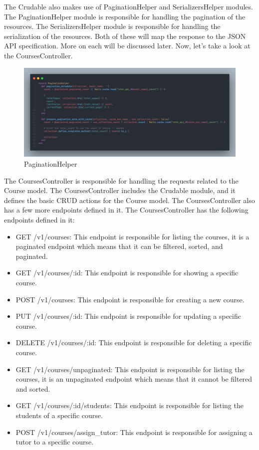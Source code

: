 \begin{justify}
    \vspace{0.25cm}
    \newendline The Crudable also makes use of PaginationHelper and SerializersHelper modules. The PaginationHelper module is responsible for handling the pagination of the resources. The SerializersHelper module is responsible for handling the serialization of the resources. Both of these will map the response to the JSON API specification. More on each will be discussed later. Now, let's take a look at the CoursesController.

    \begin{figure}[H]
        \centerline{\includegraphics[width=150mm,scale=1]{figures/implementation_and_testing/implementation/backend/pagination_helper.png}}
        \caption{PaginationHelper}
    \end{figure}

    \vspace{0.25cm}
    \newendline The CoursesController is responsible for handling the requests related to the Course model. The CoursesController includes the Crudable module, and it defines the basic CRUD actions for the Course model. The CoursesController also has a few more endpoints defined in it. The CoursesController has the following endpoints defined in it:

    \begin{itemize}
        \item GET /v1/courses: This endpoint is responsible for listing the courses, it is a paginated endpoint which means that it can be filtered, sorted, and paginated.
        \item GET /v1/courses/:id: This endpoint is responsible for showing a specific course.
        \item POST /v1/courses: This endpoint is responsible for creating a new course.
        \item PUT /v1/courses/:id: This endpoint is responsible for updating a specific course.
        \item DELETE /v1/courses/:id: This endpoint is responsible for deleting a specific course.
        \item GET /v1/courses/unpaginated: This endpoint is responsible for listing the courses, it is an unpaginated endpoint which means that it cannot be filtered and sorted.
        \item GET /v1/courses/:id/students: This endpoint is responsible for listing the students of a specific course.
        \item POST /v1/courses/assign\_tutor: This endpoint is responsible for assigning a tutor to a specific course.
    \end{itemize}


\end{justify}
